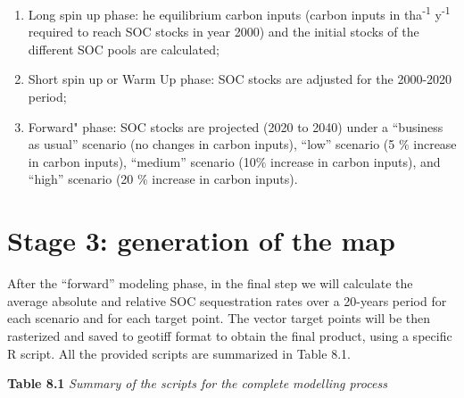 \documentclass[
  10pt,
  b5paper,
]{book}
\providecommand{\tightlist}{%
  \setlength{\itemsep}{0pt}\setlength{\parskip}{0pt}}
\begin{document}
\begin{enumerate}
\def\labelenumi{\arabic{enumi}.}
\tightlist
\item
  Long spin up phase: he equilibrium carbon inputs (carbon inputs in tha\textsuperscript{-1} y\textsuperscript{-1} required to reach SOC stocks in year 2000) and the initial stocks of the different SOC pools are calculated;
\item
  Short spin up or Warm Up phase: SOC stocks are adjusted for the 2000-2020 period;
\item
  Forward" phase: SOC stocks are projected (2020 to 2040) under a ``business as usual'' scenario (no changes in carbon inputs), ``low'' scenario (5 \(\%\) increase in carbon inputs), ``medium'' scenario (10\(\%\) increase in carbon inputs), and ``high'' scenario (20 \(\%\) increase in carbon inputs).
\end{enumerate}

\hypertarget{stage-3-generation-of-the-map}{%
\section{Stage 3: generation of the map}\label{stage-3-generation-of-the-map}}

After the ``forward'' modeling phase, in the final step we will calculate the average absolute and relative SOC sequestration rates over a 20-years period for each scenario and for each target point. The vector target points will be then rasterized and saved to geotiff format to obtain the final product, using a specific R script. All the provided scripts are summarized in Table 8.1.

\textbf{Table 8.1} \emph{Summary of the scripts for the complete modelling process}
\end{document}
